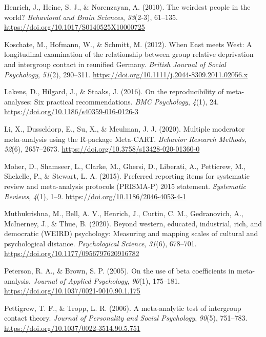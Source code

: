 \documentclass[twocolumn, 11pt, letterpaper]{article}
\begin{document}
\leavevmode\hypertarget{ref-henrich_weirdest_2010}{}%
Henrich, J., Heine, S. J., \& Norenzayan, A. (2010). The weirdest people
in the world? \emph{Behavioral and Brain Sciences}, \emph{33}(2-3),
61--135. \url{https://doi.org/10.1017/S0140525X10000725}

\leavevmode\hypertarget{ref-koschate_when_2012}{}%
Koschate, M., Hofmann, W., \& Schmitt, M. (2012). When East meets West:
A longitudinal examination of the relationship between group relative
deprivation and intergroup contact in reunified Germany. \emph{British
Journal of Social Psychology}, \emph{51}(2), 290--311.
\url{https://doi.org/10.1111/j.2044-8309.2011.02056.x}

\leavevmode\hypertarget{ref-lakens_reproducibility_2016}{}%
Lakens, D., Hilgard, J., \& Staaks, J. (2016). On the reproducibility of
meta-analyses: Six practical recommendations. \emph{BMC Psychology},
\emph{4}(1), 24. \url{https://doi.org/10.1186/s40359-016-0126-3}

\leavevmode\hypertarget{ref-li_multiple_2020}{}%
Li, X., Dusseldorp, E., Su, X., \& Meulman, J. J. (2020). Multiple
moderator meta-analysis using the R-package Meta-CART. \emph{Behavior
Research Methods}, \emph{52}(6), 2657--2673.
\url{https://doi.org/10.3758/s13428-020-01360-0}

\leavevmode\hypertarget{ref-moher_preferred_2015}{}%
Moher, D., Shamseer, L., Clarke, M., Ghersi, D., Liberati, A.,
Petticrew, M., Shekelle, P., \& Stewart, L. A. (2015). Preferred
reporting items for systematic review and meta-analysis protocols
(PRISMA-P) 2015 statement. \emph{Systematic Reviews}, \emph{4}(1), 1--9.
\url{https://doi.org/10.1186/2046-4053-4-1}

\leavevmode\hypertarget{ref-muthukrishna_beyond_2020}{}%
Muthukrishna, M., Bell, A. V., Henrich, J., Curtin, C. M., Gedranovich,
A., McInerney, J., \& Thue, B. (2020). Beyond western, educated,
industrial, rich, and democratic (WEIRD) psychology: Measuring and
mapping scales of cultural and psychological distance.
\emph{Psychological Science}, \emph{31}(6), 678--701.
\url{https://doi.org/10.1177/0956797620916782}

\leavevmode\hypertarget{ref-peterson_use_2005}{}%
Peterson, R. A., \& Brown, S. P. (2005). On the use of beta coefficients
in meta-analysis. \emph{Journal of Applied Psychology}, \emph{90}(1),
175--181. \url{https://doi.org/10.1037/0021-9010.90.1.175}

\leavevmode\hypertarget{ref-pettigrew_meta-analytic_2006}{}%
Pettigrew, T. F., \& Tropp, L. R. (2006). A meta-analytic test of
intergroup contact theory. \emph{Journal of Personality and Social
Psychology}, \emph{90}(5), 751--783.
\url{https://doi.org/10.1037/0022-3514.90.5.751}
\end{document}

